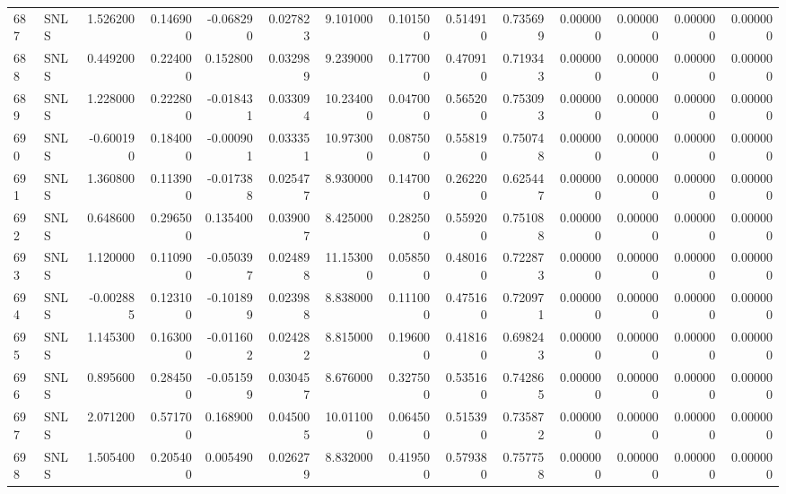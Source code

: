 \begin{tabular}{llrrrrrrrrrrrr}
687 &   SNLS &  1.526200 &      0.146900 & -0.068290 &    0.027823 &   9.101000 &      0.101500 &   0.514910 &  0.735699 &  0.000000 &   0.000000 &     0.000000 &     0.000000 \\
688 &   SNLS &  0.449200 &      0.224000 &  0.152800 &    0.032989 &   9.239000 &      0.177000 &   0.470910 &  0.719343 &  0.000000 &   0.000000 &     0.000000 &     0.000000 \\
689 &   SNLS &  1.228000 &      0.222800 & -0.018431 &    0.033094 &  10.234000 &      0.047000 &   0.565200 &  0.753093 &  0.000000 &   0.000000 &     0.000000 &     0.000000 \\
690 &   SNLS & -0.600190 &      0.184000 & -0.000901 &    0.033351 &  10.973000 &      0.087500 &   0.558190 &  0.750748 &  0.000000 &   0.000000 &     0.000000 &     0.000000 \\
691 &   SNLS &  1.360800 &      0.113900 & -0.017388 &    0.025477 &   8.930000 &      0.147000 &   0.262200 &  0.625447 &  0.000000 &   0.000000 &     0.000000 &     0.000000 \\
692 &   SNLS &  0.648600 &      0.296500 &  0.135400 &    0.039007 &   8.425000 &      0.282500 &   0.559200 &  0.751088 &  0.000000 &   0.000000 &     0.000000 &     0.000000 \\
693 &   SNLS &  1.120000 &      0.110900 & -0.050397 &    0.024898 &  11.153000 &      0.058500 &   0.480160 &  0.722873 &  0.000000 &   0.000000 &     0.000000 &     0.000000 \\
694 &   SNLS & -0.002885 &      0.123100 & -0.101899 &    0.023988 &   8.838000 &      0.111000 &   0.475160 &  0.720971 &  0.000000 &   0.000000 &     0.000000 &     0.000000 \\
695 &   SNLS &  1.145300 &      0.163000 & -0.011602 &    0.024282 &   8.815000 &      0.196000 &   0.418160 &  0.698243 &  0.000000 &   0.000000 &     0.000000 &     0.000000 \\
696 &   SNLS &  0.895600 &      0.284500 & -0.051599 &    0.030457 &   8.676000 &      0.327500 &   0.535160 &  0.742865 &  0.000000 &   0.000000 &     0.000000 &     0.000000 \\
697 &   SNLS &  2.071200 &      0.571700 &  0.168900 &    0.045005 &  10.011000 &      0.064500 &   0.515390 &  0.735872 &  0.000000 &   0.000000 &     0.000000 &     0.000000 \\
698 &   SNLS &  1.505400 &      0.205400 &  0.005490 &    0.026279 &   8.832000 &      0.419500 &   0.579380 &  0.757758 &  0.000000 &   0.000000 &     0.000000 &     0.000000 \\

\end{tabular}
